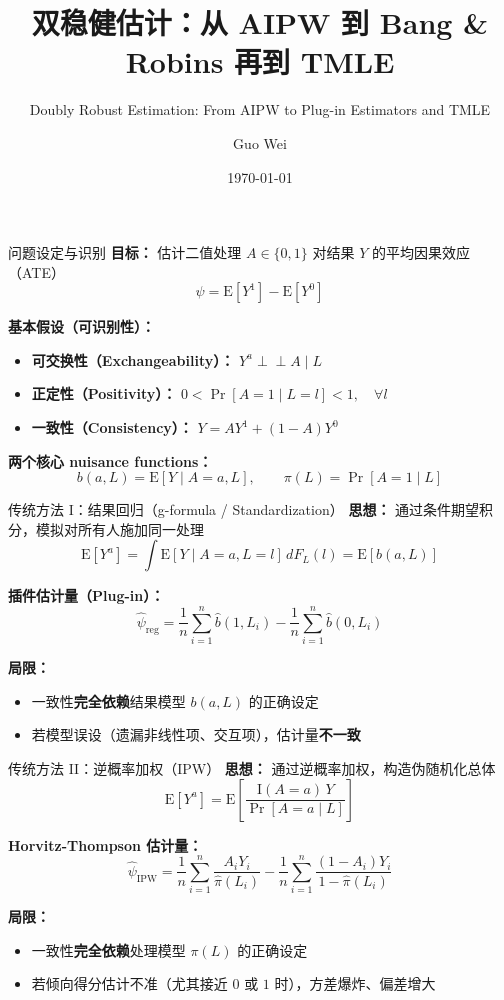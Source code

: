 \documentclass[aspectratio=169,10pt]{beamer}
\title{双稳健估计：从 AIPW 到 Bang \& Robins 再到 TMLE}
\subtitle{Doubly Robust Estimation: From AIPW to Plug-in Estimators and TMLE}
\author{Guo Wei}
\institute{Department of Health Statistics, NMU}
\date{\today}
\newcommand{\E}{\mathrm{E}}
\newcommand{\Prb}{\Pr}
\newcommand{\ind}{\perp\!\!\!\perp}
\begin{document}
	
	\begin{frame}
		\titlepage
	\end{frame}
	
	\begin{frame}{问题设定与识别}
		\textbf{目标：} 估计二值处理 $A \in \{0,1\}$ 对结果 $Y$ 的平均因果效应（ATE）
		\[
		\psi = \E[Y^1] - \E[Y^0]
		\]
		
		\textbf{基本假设（可识别性）：}
		\begin{itemize}
			\item \textbf{可交换性（Exchangeability）：} $Y^a \ind A \mid L$
			\item \textbf{正定性（Positivity）：} $0 < \Prb[A=1\mid L=l] < 1,\quad \forall l$
			\item \textbf{一致性（Consistency）：} $Y = AY^1 + (1-A)Y^0$
		\end{itemize}
		
		\textbf{两个核心 nuisance functions：}
		\[
		b(a,L) = \E[Y\mid A=a, L], \qquad \pi(L) = \Prb[A=1\mid L]
		\]
	\end{frame}
	
	\begin{frame}{传统方法 I：结果回归（g-formula / Standardization）}
		\textbf{思想：} 通过条件期望积分，模拟对所有人施加同一处理
		\[
		\E[Y^a] = \int \E[Y\mid A=a, L=l]\, dF_L(l) = \E[b(a,L)]
		\]
		
		\textbf{插件估计量（Plug-in）：}
		\[
		\widehat{\psi}_{\text{reg}} = \frac{1}{n}\sum_{i=1}^n \widehat{b}(1, L_i) - \frac{1}{n}\sum_{i=1}^n \widehat{b}(0, L_i)
		\]
		
		\textbf{局限：}
		\begin{itemize}
			\item 一致性\textbf{完全依赖}结果模型 $b(a,L)$ 的正确设定
			\item 若模型误设（遗漏非线性项、交互项），估计量\textbf{不一致}
		\end{itemize}
	\end{frame}
	
	\begin{frame}{传统方法 II：逆概率加权（IPW）}
		\textbf{思想：} 通过逆概率加权，构造伪随机化总体
		\[
		\E[Y^a] = \E\!\left[\frac{\mathrm{I}(A=a)\, Y}{\Prb[A=a\mid L]}\right]
		\]
		
		\textbf{Horvitz-Thompson 估计量：}
		\[
		\widehat{\psi}_{\text{IPW}} = \frac{1}{n}\sum_{i=1}^n \frac{A_i Y_i}{\widehat{\pi}(L_i)} - \frac{1}{n}\sum_{i=1}^n \frac{(1-A_i) Y_i}{1-\widehat{\pi}(L_i)}
		\]
		
		\textbf{局限：}
		\begin{itemize}
			\item 一致性\textbf{完全依赖}处理模型 $\pi(L)$ 的正确设定
			\item 若倾向得分估计不准（尤其接近 $0$ 或 $1$ 时），方差爆炸、偏差增大
		\end{itemize}
	\end{frame}
	
\end{document}
